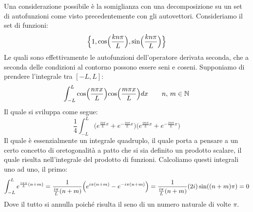 Una considerazione possibile è la somiglianza con una decomposizione su un set di autofunzioni come visto precedentemente con gli autovettori. Consideriamo il set di funzioni:
\begin{equation}
    \Bigl\{ 1, \cos\Bigr( \frac{kn\pi}{L} \Bigl), \sin\Bigr( \frac{kn\pi}{L} \Bigl) \Bigr\}
\end{equation}
Le quali sono effettivamente le autofunzioni dell'operatore derivata seconda, che a seconda delle condizioni al contorno possono essere seni e coseni. Supponiamo di prendere l'integrale tra $[-L,L]$:
\begin{equation*}
    \int_{-L}^{L} \cos\Bigr( \frac{n\pi x}{L} \Bigl) \cos\Bigr( \frac{m\pi x}{L} \Bigl) dx \qquad
    n, \, m \in \mathbb{N}
\end{equation*}
Il quale si sviluppa come segue:
\begin{equation*}
    \frac{1}{4} \int_{-L}^{L} \bigl( e^{\frac{in\pi}{L}x} + e^{-\frac{in\pi}{L}x} \bigr) \bigl( e^{\frac{im\pi}{L}x} + e^{-\frac{im\pi}{L}x} \bigr)
\end{equation*}
Il quale è essenzialmente un integrale quadruplo, il quale porta a pensare a un certo concetto di oretogonalità a patto che si sia definito un prodotto scalare, il quale risulta nell'integrale del prodotto di funzioni. Calcoliamo questi integrali uno ad uno, il primo:
\begin{equation*}
    \int_{-L}^{L} e^{\frac{i\pi x}{L}(n+m)} =
    \frac{1}{\frac{i\pi}{L}(n+m)} \Bigl( e^{i\pi(n+m)} - e^{-i\pi(n+m)} \Bigr) =
    \frac{1}{\frac{i\pi}{L}(n+m)} (2i) \sin((n+m)\pi) = 0
\end{equation*}
Dove il tutto si annulla poiché risulta il seno di un numero naturale di volte $\pi$.
